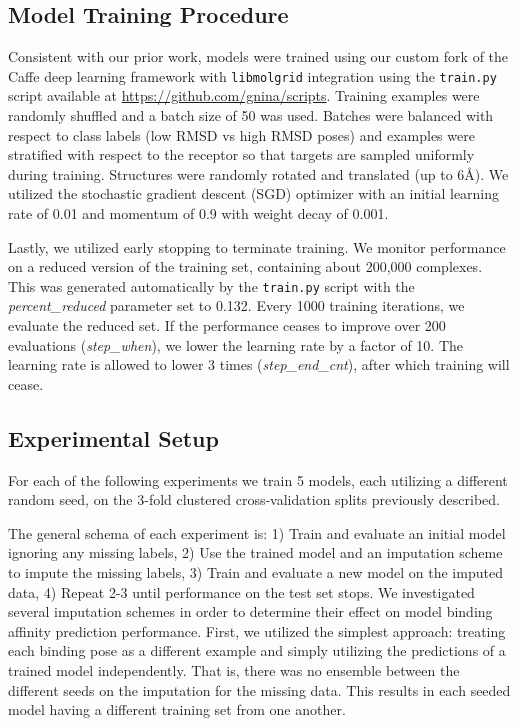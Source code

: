 \documentclass[journal=jmcmar,manuscript=article]{achemso}
\begin{document}
\subsection{Model Training Procedure}
Consistent with our prior work\cite{crossdocked2020}, models were trained using our custom fork of the Caffe deep learning framework \cite{jia2014caffe} with \texttt{libmolgrid} integration \cite{sunseri2019libmolgrid} using the \texttt{train.py} script available at \url{https://github.com/gnina/scripts}.
Training examples were randomly shuffled and a batch size of 50 was used.
Batches were balanced with respect to class labels (low RMSD vs high RMSD poses) and examples were stratified with respect to the receptor so that targets are sampled uniformly during training.
Structures were randomly rotated and translated (up to 6{\AA}).
We utilized the stochastic gradient descent (SGD) optimizer with an initial learning rate of 0.01 and momentum of 0.9 with weight decay of 0.001.

Lastly, we utilized early stopping to terminate training.
We monitor performance on a reduced version of the training set, containing about 200,000 complexes.
This was generated automatically by the \texttt{train.py} script with the \textit{percent\_reduced} parameter set to 0.132.
Every 1000 training iterations, we evaluate the reduced set.
If the performance ceases to improve over 200 evaluations (\textit{step\_when}), we lower the learning rate by a factor of 10.
The learning rate is allowed to lower 3 times (\textit{step\_end\_cnt}), after which training will cease.

\subsection{Experimental Setup}
For each of the following experiments we train 5 models, each utilizing a different random seed, on the 3-fold clustered cross-validation splits previously described.

The general schema of each experiment is: 1) Train and evaluate an initial model ignoring any missing labels, 2) Use the trained model and an imputation scheme to impute the missing labels, 3) Train and evaluate a new model on the imputed data, 4) Repeat 2-3 until performance on the test set stops.
We investigated several imputation schemes in order to determine their effect on model binding affinity prediction performance.
First, we utilized the simplest approach: treating each binding pose as a different example and simply utilizing the predictions of a trained model independently.
That is, there was no ensemble between the different seeds on the imputation for the missing data.
This results in each seeded model having a different training set from one another.
\end{document}
